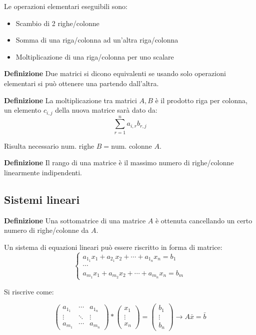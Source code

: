 \documentclass{article}
\begin{document}
\noindent Le operazioni elementari eseguibili sono:
\begin{itemize}
    \item Scambio di 2 righe/colonne
    \item Somma di una riga/colonna ad un'altra riga/colonna
    \item Moltiplicazione di una riga/colonna per uno scalare\newline
\end{itemize}

\noindent\textbf{Definizione} Due matrici si dicono equivalenti se usando solo operazioni elementari si può ottenere una partendo dall'altra.\newline

\noindent\textbf{Definizione} La moltiplicazione tra matrici $A,B$ è il prodotto riga per colonna, un elemento $c_{i,j}$ della nuova matrice sarà dato da:
$$\sum_{r=1}^na_{i,r}b_{r,j}$$

\noindent Risulta necessario $\text{num. righe }B=\text{num. colonne }A$.\newline

\noindent\textbf{Definizione} Il rango di una matrice è il massimo numero di righe/colonne linearmente indipendenti.\newline

\subsection{Sistemi lineari}

\textbf{Definizione} Una sottomatrice di una matrice $A$ è ottenuta cancellando un certo numero di righe/colonne da $A$.\newline

\noindent Un sistema di equazioni lineari può essere riscritto in forma di matrice:
\[\begin{cases}
    a_{1_1}x_1+a_{2_1}x_2+\cdots+a_{1_n}x_n=b_1\\
    \cdots\\
    a_{m_1}x_1+a_{m_2}x_2+\cdots+a_{m_n}x_n=b_m
\end{cases}\]

\vspace{5pt}

\noindent Si riscrive come:

\[\begin{pmatrix}
     a_{1_1} & \cdots & a_{1_n} \\
     \vdots & \ddots  & \vdots\\
     a_{m_1} & \cdots & a_{m_n}
\end{pmatrix}
* 
\begin{pmatrix}
  x_1\\
  \vdots\\
  x_n
\end{pmatrix}
=
\begin{pmatrix}
  b_1\\
  \vdots\\
  b_n 
\end{pmatrix}
\rightarrow
A\bar{x}=\bar{b}
\]
\end{document}
